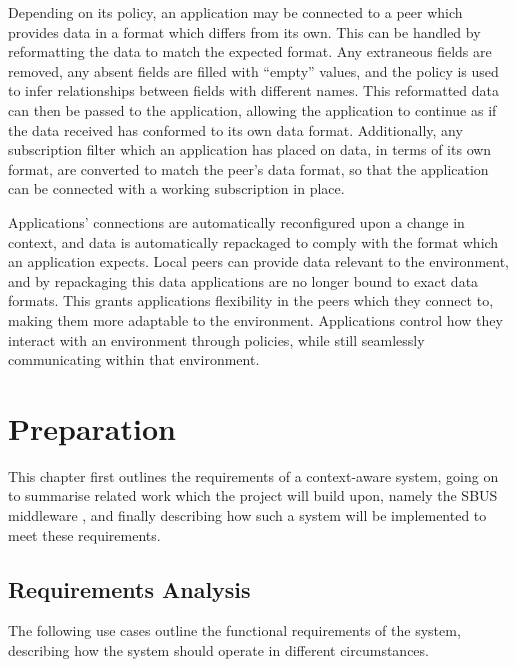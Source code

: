 \documentclass[12pt,twoside,notitlepage]{report}
\begin{document}
Depending on its policy, an application may be connected to a peer which provides data in a format which differs from its own.
This can be handled by reformatting the data to match the expected format. 
Any extraneous fields are removed, any absent fields are filled with ``empty'' values, and the policy is used to infer relationships between fields with different names. 
This reformatted data can then be passed to the application, allowing the application to continue as if the data received has conformed to its own data format. 
Additionally, any subscription filter which an application has placed on data, in terms of its own format, are converted to match the peer's data format, so that the application can be connected with a working subscription in place. 


Applications' connections are automatically reconfigured upon a change in context, and data is automatically repackaged to comply with the format which an application expects. 
Local peers can provide data relevant to the environment, and by repackaging this data applications are no longer bound to exact data formats. 
This grants applications flexibility in the peers which they connect to, making them more adaptable to the environment. 
Applications control how they interact with an environment through policies, while still seamlessly communicating within that environment.

\cleardoublepage

 
\chapter{Preparation}

This chapter first outlines the requirements of a context-aware system, going on to summarise related work which the project will build upon, namely the SBUS middleware \cite{ingram2009reconfigurable}, and finally describing how such a system will be implemented to meet these requirements.


\section{Requirements Analysis}

The following use cases outline the functional requirements of the system, describing how the system should operate in different circumstances.
\end{document}
